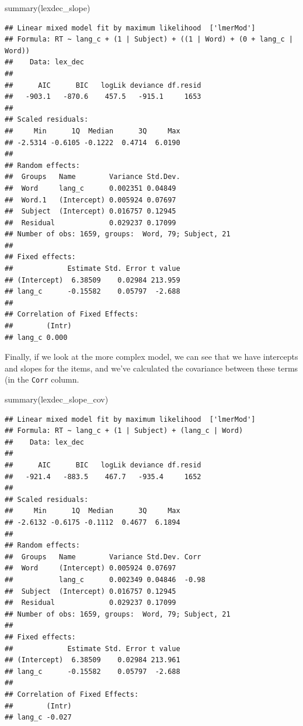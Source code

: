 \documentclass[
]{book}
\newenvironment{Shaded}{\begin{snugshade}}{\end{snugshade}}
\newcommand{\FunctionTok}[1]{\textcolor[rgb]{0.00,0.00,0.00}{#1}}
\newcommand{\NormalTok}[1]{#1}
\begin{document}
\begin{Shaded}
\begin{Highlighting}[]
\FunctionTok{summary}\NormalTok{(lexdec\_slope)}
\end{Highlighting}
\end{Shaded}

\begin{verbatim}
## Linear mixed model fit by maximum likelihood  ['lmerMod']
## Formula: RT ~ lang_c + (1 | Subject) + ((1 | Word) + (0 + lang_c | Word))
##    Data: lex_dec
## 
##      AIC      BIC   logLik deviance df.resid 
##   -903.1   -870.6    457.5   -915.1     1653 
## 
## Scaled residuals: 
##     Min      1Q  Median      3Q     Max 
## -2.5314 -0.6105 -0.1222  0.4714  6.0190 
## 
## Random effects:
##  Groups   Name        Variance Std.Dev.
##  Word     lang_c      0.002351 0.04849 
##  Word.1   (Intercept) 0.005924 0.07697 
##  Subject  (Intercept) 0.016757 0.12945 
##  Residual             0.029237 0.17099 
## Number of obs: 1659, groups:  Word, 79; Subject, 21
## 
## Fixed effects:
##             Estimate Std. Error t value
## (Intercept)  6.38509    0.02984 213.959
## lang_c      -0.15582    0.05797  -2.688
## 
## Correlation of Fixed Effects:
##        (Intr)
## lang_c 0.000
\end{verbatim}

Finally, if we look at the more complex model, we can see that we have intercepts and slopes for the items, and we've calculated the covariance between these terms (in the \texttt{Corr} column.

\begin{Shaded}
\begin{Highlighting}[]
\FunctionTok{summary}\NormalTok{(lexdec\_slope\_cov)}
\end{Highlighting}
\end{Shaded}

\begin{verbatim}
## Linear mixed model fit by maximum likelihood  ['lmerMod']
## Formula: RT ~ lang_c + (1 | Subject) + (lang_c | Word)
##    Data: lex_dec
## 
##      AIC      BIC   logLik deviance df.resid 
##   -921.4   -883.5    467.7   -935.4     1652 
## 
## Scaled residuals: 
##     Min      1Q  Median      3Q     Max 
## -2.6132 -0.6175 -0.1112  0.4677  6.1894 
## 
## Random effects:
##  Groups   Name        Variance Std.Dev. Corr 
##  Word     (Intercept) 0.005924 0.07697       
##           lang_c      0.002349 0.04846  -0.98
##  Subject  (Intercept) 0.016757 0.12945       
##  Residual             0.029237 0.17099       
## Number of obs: 1659, groups:  Word, 79; Subject, 21
## 
## Fixed effects:
##             Estimate Std. Error t value
## (Intercept)  6.38509    0.02984 213.961
## lang_c      -0.15582    0.05797  -2.688
## 
## Correlation of Fixed Effects:
##        (Intr)
## lang_c -0.027
\end{verbatim}
\end{document}
